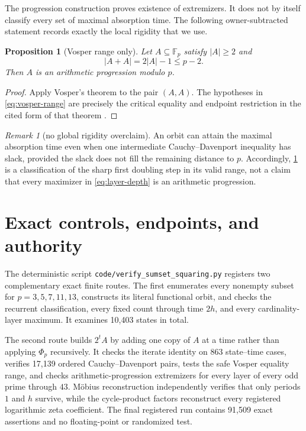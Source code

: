 \documentclass[11pt,a4paper]{amsart}
\newtheorem{proposition}[theorem]{Proposition}
\theoremstyle{definition}
\theoremstyle{remark}
\newtheorem{remark}[theorem]{Remark}
\newcommand{\Fp}{\mathbb F_p}
\newcommand{\card}[1]{\lvert #1\rvert}
\begin{document}
The progression construction proves existence of extremizers.  It does not
by itself classify every set of maximal absorption time.  The following
owner-subtracted statement records exactly the local rigidity that we use.

\begin{proposition}[Vosper range only]\label{prop:vosper}
Let $A\subseteq\Fp$ satisfy $\card A\geq2$ and
\begin{equation}\label{eq:vosper-range}
 \card{A+A}=2\card A-1\leq p-2.
\end{equation}
Then $A$ is an arithmetic progression modulo $p$.
\end{proposition}

\begin{proof}
Apply Vosper's theorem to the pair $(A,A)$.  The hypotheses in
\eqref{eq:vosper-range} are precisely the critical equality and endpoint
restriction in the cited form of that theorem \cite{Vosper1956}.
\end{proof}

\begin{remark}[no global rigidity overclaim]\label{rem:no-overclaim}
An orbit can attain the maximal absorption time even when one intermediate
Cauchy--Davenport inequality has slack, provided the slack does not fill the
remaining distance to $p$.  Accordingly, \cref{prop:vosper} is a
classification of the sharp first doubling step in its valid range, not a
claim that every maximizer in \eqref{eq:layer-depth} is an arithmetic
progression.
\end{remark}

\section{Exact controls, endpoints, and authority}

The deterministic script \texttt{code/verify\_sumset\_squaring.py} registers
two complementary exact finite routes.  The first enumerates every nonempty subset
for $p=3,5,7,11,13$, constructs its literal functional orbit, and checks the
recurrent classification, every fixed count through time $2h$, and every
cardinality-layer maximum.  It examines 10,403 states in total.

The second route builds $2^tA$ by adding one copy of $A$ at a time rather
than applying $\Phi_p$ recursively.  It checks the iterate identity on 863
state--time cases, verifies 17,139 ordered Cauchy--Davenport pairs, tests the
safe Vosper equality range, and checks arithmetic-progression extremizers
for every layer of every odd prime through $43$.  M\"obius reconstruction
independently verifies that only periods $1$ and $h$ survive, while the
cycle-product factors reconstruct every registered logarithmic zeta
coefficient.  The final registered run contains 91,509 exact assertions and no floating-point or
randomized test.
\end{document}
